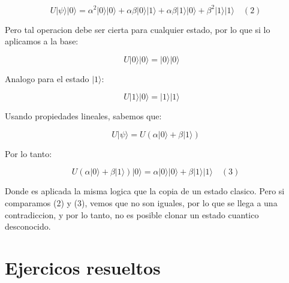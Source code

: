 \documentclass[11pt]{article}
\begin{document}
\begin{equation}
    U |\psi\rangle |0\rangle = \alpha^2 |0\rangle |0\rangle + \alpha \beta |0\rangle |1\rangle + \alpha \beta |1\rangle |0\rangle + \beta^2 |1\rangle |1\rangle \quad (2)
\end{equation}

Pero tal operacion debe ser cierta para cualquier estado, por lo que si lo aplicamos a la base:

\begin{equation}
    U |0\rangle |0\rangle = |0\rangle |0\rangle \quad 
\end{equation}

Analogo para el estado $|1\rangle$:

\begin{equation}
    U |1\rangle |0\rangle = |1\rangle |1\rangle \quad
\end{equation}

Usando propiedades lineales, sabemos que:

\begin{equation}
    U |\psi\rangle = U (\alpha |0\rangle + \beta |1\rangle) 
\end{equation}

Por lo tanto:

\begin{equation}
    U (\alpha |0\rangle + \beta |1\rangle) |0\rangle = \alpha |0\rangle |0\rangle + \beta |1\rangle |1\rangle \quad (3)
\end{equation}

Donde es aplicada la misma logica que la copia de un estado clasico. Pero si comparamos (2) y (3), vemos que no son iguales, por lo que se llega a una contradiccion, y por lo tanto, no es posible clonar un estado cuantico desconocido.

\section{Ejercicos resueltos}
\end{document}
